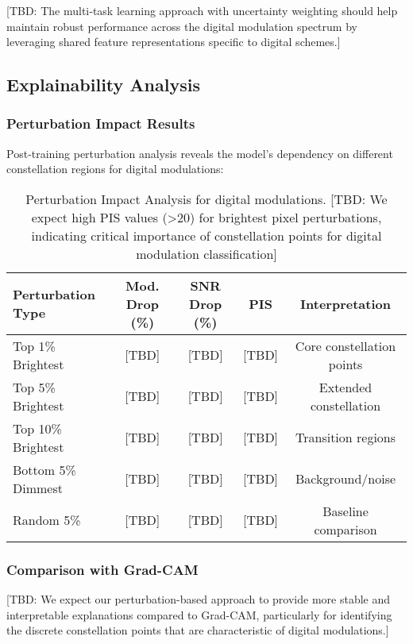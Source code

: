\documentclass{ELSP}
\begin{document}
[TBD: The multi‑task learning approach with uncertainty weighting should help maintain robust performance across the digital modulation spectrum by leveraging shared feature representations specific to digital schemes.]

\subsection{Explainability Analysis}

\subsubsection{Perturbation Impact Results}

Post‑training perturbation analysis reveals the model's dependency on different constellation regions for digital modulations:

\begin{table}[H]
\centering
\begin{tabular}{lcccc}
\toprule
\textbf{Perturbation Type} & \textbf{Mod. Drop (\%)} & \textbf{SNR Drop (\%)} & \textbf{PIS} & \textbf{Interpretation} \\
\midrule
Top 1\% Brightest & [TBD] & [TBD] & [TBD] & Core constellation points \\
Top 5\% Brightest & [TBD] & [TBD] & [TBD] & Extended constellation \\
Top 10\% Brightest & [TBD] & [TBD] & [TBD] & Transition regions \\
Bottom 5\% Dimmest & [TBD] & [TBD] & [TBD] & Background/noise \\
Random 5\% & [TBD] & [TBD] & [TBD] & Baseline comparison \\
\bottomrule
\end{tabular}
\caption{Perturbation Impact Analysis for digital modulations. [TBD: We expect high PIS values (>20) for brightest pixel perturbations, indicating critical importance of constellation points for digital modulation classification]}
\label{tab:perturbation}
\end{table}

\subsubsection{Comparison with Grad-CAM}

[TBD: We expect our perturbation-based approach to provide more stable and interpretable explanations compared to Grad-CAM, particularly for identifying the discrete constellation points that are characteristic of digital modulations.]
\end{document}
